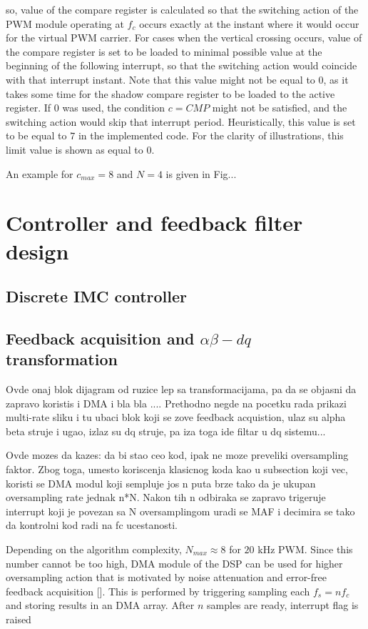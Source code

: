 \documentclass[journal]{IEEEtran}
\begin{document}
 so, value of the compare register is calculated so that the switching action of the PWM module operating at $f_c$ occurs exactly at the instant where it would occur for the virtual PWM carrier. For cases when the vertical crossing occurs, value of the compare register is set to be loaded to minimal possible value at the beginning of the following interrupt, so that the switching action would coincide with that interrupt instant. Note that this value might not be equal to $0$, as it takes some time for the shadow compare register to be loaded to the active register. If $0$ was used, the condition $c = CMP$ might not be satisfied, and the switching action would skip that interrupt period. Heuristically, this value is set to be equal to $7$ in the implemented code. For the clarity of illustrations, this limit value is shown as equal to $0$. 

 


An example for $c_{max} = 8$ and $N=4$ is given in Fig...

\section{Controller and feedback filter design}

\subsection{Discrete IMC controller}

\subsection{Feedback acquisition and $\alpha \beta - dq$ transformation}
Ovde onaj blok dijagram od ruzice lep sa transformacijama, pa da se objasni da zapravo koristis i DMA i bla bla .... Prethodno negde na pocetku rada prikazi multi-rate sliku i tu ubaci blok koji se zove feedback acquistion, ulaz su alpha beta struje i ugao, izlaz su dq struje, pa iza toga ide filtar u dq sistemu...

Ovde mozes da kazes: da bi stao ceo kod, ipak ne moze preveliki oversampling faktor. Zbog toga, umesto koriscenja klasicnog koda kao u subsection koji vec, koristi se DMA modul koji sempluje jos n puta brze tako da je ukupan oversampling rate jednak n*N. Nakon tih n odbiraka se zapravo trigeruje interrupt koji je povezan sa N oversamplingom uradi se MAF i decimira se tako da kontrolni kod radi na fc ucestanosti.

Depending on the algorithm complexity, $N_{max} \approx 8$ for $20$ kHz PWM. Since this number cannot be too high, DMA module of the DSP can be used for higher oversampling action that is motivated by noise attenuation and error-free feedback acquisition []. This is performed by triggering sampling each $f_s = nf_c$ and storing results in an DMA array. After $n$ samples are ready, interrupt flag is raised 
\end{document}
